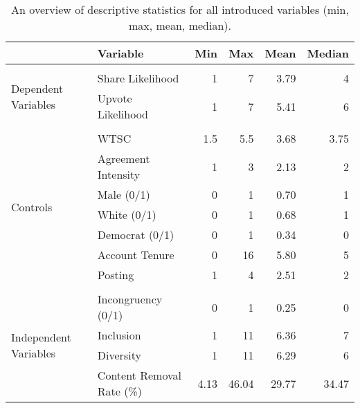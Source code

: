 \begin{table*}[]
    \footnotesize
    \centering
    \caption{An overview of descriptive statistics for all introduced variables (min, max, mean, median).}
    \begin{tabular}{p{1.75in}p{1.3in}rrrr}
    \toprule
     &  Variable  & Min & Max & Mean & Median\\
    \midrule \\  [-1.2ex]
    \multirow{2}{1.5in}{Dependent Variables} & Share Likelihood & 1 & 7 & 3.79 & 4\\
    & Upvote Likelihood & 1 & 7 & 5.41 & 6\\[1.2ex]
    \hline \\ [-1.2ex]
    \multirow{7}{0.75in}{Controls} 
    & WTSC & 1.5 & 5.5 & 3.68 & 3.75\\
    & Agreement Intensity & 1 & 3 & 2.13 & 2\\
    & Male (0/1) & 0 & 1 & 0.70 & 1 \\
    & White (0/1) & 0 & 1 & 0.68 & 1\\ 
    & Democrat (0/1) & 0 & 1 & 0.34 & 0\\
    & Account Tenure & 0 & 16 & 5.80 & 5\\ 
    & Posting & 1 & 4 & 2.51 & 2\\[1.2ex]
    \hline 
    \\ [-1.2ex]
    \multirow{5}{1.5in}{Independent Variables} & Incongruency (0/1) & 0 & 1 & 0.25 & 0 \\
    & Inclusion & 1 & 11 & 6.36 & 7\\
    & Diversity & 1 & 11 & 6.29 & 6\\
    & Content Removal Rate (\%) & 4.13 & 46.04 & 29.77 & 34.47\\ 
    \bottomrule
    \end{tabular}
    \label{tab:variables}
\end{table*}